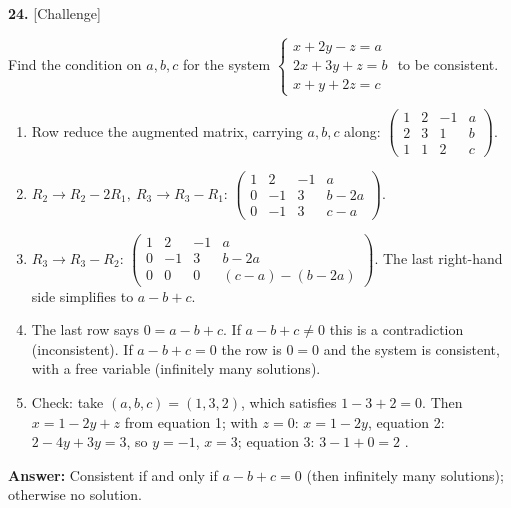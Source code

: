 \documentclass[11pt]{article}
\begin{document}
\par\vspace{2pt}
\begin{minipage}{\linewidth}\textbf{24.} \hfill{\scriptsize\color{ink}[Challenge]}\par\nopagebreak Find the condition on $a,b,c$ for the system $\begin{cases}x+2y-z=a\\ 2x+3y+z=b\\ x+y+2z=c\end{cases}$ to be consistent.
\end{minipage}\par\nopagebreak
\begin{tcolorbox}[breakable,colback=ans,colframe=ansb,boxrule=0.5pt,left=4pt,right=4pt,top=2pt,bottom=2pt]\begin{enumerate}[leftmargin=2.2em,itemsep=1pt,topsep=1pt,label=\textbf{Step \arabic*.}]\item Row reduce the augmented matrix, carrying $a,b,c$ along: $\displaystyle\left(\begin{array}{ccc|c}1&2&-1&a\\2&3&1&b\\1&1&2&c\end{array}\right)$.
\item $R_2\to R_2-2R_1,\ R_3\to R_3-R_1$: $\displaystyle\left(\begin{array}{ccc|c}1&2&-1&a\\0&-1&3&b-2a\\0&-1&3&c-a\end{array}\right)$.
\item $R_3\to R_3-R_2$: $\displaystyle\left(\begin{array}{ccc|c}1&2&-1&a\\0&-1&3&b-2a\\0&0&0&(c-a)-(b-2a)\end{array}\right)$. The last right-hand side simplifies to $a-b+c$.
\item The last row says $0=a-b+c$. If $a-b+c\neq0$ this is a contradiction (inconsistent). If $a-b+c=0$ the row is $0=0$ and the system is consistent, with a free variable (infinitely many solutions).
\item Check: take $(a,b,c)=(1,3,2)$, which satisfies $1-3+2=0$. Then $x=1-2y+z$ from equation 1; with $z=0$: $x=1-2y$, equation 2: $2-4y+3y=3$, so $y=-1$, $x=3$; equation 3: $3-1+0=2$ \checkmark.
\end{enumerate}\textbf{Answer:} Consistent if and only if $a-b+c=0$ (then infinitely many solutions); otherwise no solution.\end{tcolorbox}
\end{document}
